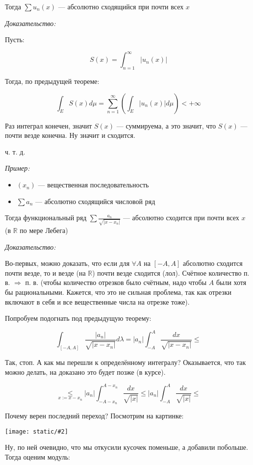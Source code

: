 \documentclass{article}
\def\images#1#2{\begin{center}\texttt{[image: static/\#2]}\end{center}}
\begin{document}
Тогда $\sum u_n(x)$ --- абсолютно сходящийся при почти всех $x$

\textit{Доказательство: }

Пусть: 

\[S(x) = \int_{n = 1}^{\infty} \left|u_n(x)\right|\]

Тогда, по предыдущей теореме: 

\[\int_{E} S(x) d\mu = \sum_{n = 1}^{\infty} \left(\int_{E} |u_n(x)| d\mu\right) < +\infty\]

Раз интеграл конечен, значит $S(x)$ --- суммируема, а это значит, что $S(x)$ --- почти везде конечна. Ну значит и сходится.

ч. т. д.

\textit{Пример: }

\begin{itemize}
    \item $(x_n)$ --- вещественная последовательность
    \item $\sum a_n$ --- абсолютно сходящийся числовой ряд
\end{itemize}

Тогда функциональный ряд $\sum \frac{a_n}{\sqrt{|x - x_n|}}$  --- абсолютно сходится при почти всех $x$ (в $\mathbb{R}$ по мере Лебега)

\textit{Доказательство: }

Во-первых, можно доказать, что если для $\forall A$ на $[-A, A]$ абсолютно сходится почти везде, то и везде (на $\mathbb{R}$) почти везде сходится (лол). Счётное количество п. в. $\Rightarrow$ п. в. (чтобы количество отрезков было счётным, надо чтобы $A$ были хотя бы рациональными. Кажется, что это не сильная проблема, так как отрезки включают в себя и все вещественные числа на отрезке тоже).

Попробуем подогнать под предыдущую теорему: 

\[\int_{[-A, A]}\frac{|a_n|}{\sqrt{|x - x_n|}} d\lambda = |a_n| \int_{-A}^{A} \frac{dx}{\sqrt{|x - x_n|}} \le\]

Так, стоп. А как мы перешли к определённому интегралу? Оказывается, что так можно делать, на доказано это будет позже (в курсе).

\[\underset{x := x - x_n}{\le} |a_n| \int_{-A - x_n}^{A - x_n} \frac{dx}{\sqrt{|x|}} \le |a_n| \int_{-A}^{A} \frac{dx}{\sqrt{|x|}} \le\]

Почему верен последний переход? Посмотрим на картинке: 

\images{0.5}{sh_pol_r.png}

Ну, по ней очевидно, что мы откусили кусочек поменьше, а добавили побольше. Тогда оценим модуль: 
\end{document}

